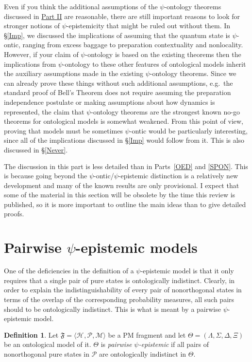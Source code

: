 \documentclass[DIV=calc,paper=a4,fontsize=11pt,twocolumn]{scrartcl} %
\theoremstyle{definition}
\newtheorem{definition}{Definition}[section]
\theoremstyle{plain}
\newcommand{\Hilb}[1][]{\ensuremath{\mathcal{H}_{#1}}}
\begin{document}
Even if you think the additional assumptions of the $\psi$-ontology
theorems discussed in \hyperref[SPON]{Part II} are reasonable, there are still
important reasons to look for stronger notions of $\psi$-epistemicity
that might be ruled out without them.  In \S\ref{Imp}, we discussed
the implications of assuming that the quantum state is $\psi$-ontic,
ranging from excess baggage to preparation contextuality and
nonlocality.  However, if your claim of $\psi$-ontology is based on
the existing theorems then the implications from $\psi$-ontology to
these other features of ontological models inherit the auxiliary
assumptions made in the existing $\psi$-ontology theorems.  Since we
can already prove these things without such additional assumptions,
e.g.\ the standard proof of Bell's Theorem does not require assuming
the preparation independence postulate or making assumptions about how
dynamics is represented, the claim that $\psi$-ontology theorems are
the strongest known no-go theorems for ontological models is somewhat
weakened.  From this point of view, proving that models must be
sometimes $\psi$-ontic would be particularly interesting, since all of
the implications discussed in \S\ref{Imp} would follow from it.  This
is also discussed in \S\ref{Never}.

The discussion in this part is less detailed than in Parts~\ref{OED}
and \ref{SPON}.  This is because going beyond the
$\psi$-ontic/$\psi$-epistemic distinction is a relatively new
development and many of the known results are only provisional.  I
expect that some of the material in this section will be obsolete by
the time this review is published, so it is more important to outline
the main ideas than to give detailed proofs.

\section{Pairwise $\psi$-epistemic models}

\label{Pair}

One of the deficiencies in the definition of a $\psi$-epistemic model
is that it only requires that a single pair of pure states is
ontologically indistinct.  Clearly, in order to explain the
indistinguishability of every pair of nonorthogonal states in terms of
the overlap of the corresponding probability measures, all such pairs
should to be ontologically indistinct.  This is what is meant by a
pairwise $\psi$-epistemic model.

\begin{definition}
Let $\mathfrak{F} = \langle \Hilb, \mathcal{P}, \mathcal{M} \rangle$
be a PM fragment and let $\Theta = (\Lambda, \Sigma, \Delta, \Xi)$ be
an ontological model of it.  $\Theta$ is \emph{pairwise
$\psi$-epistemic} if all pairs of nonorthogonal pure states in
$\mathcal{P}$ are ontologically indistinct in $\Theta$.
\end{definition}
\end{document}
